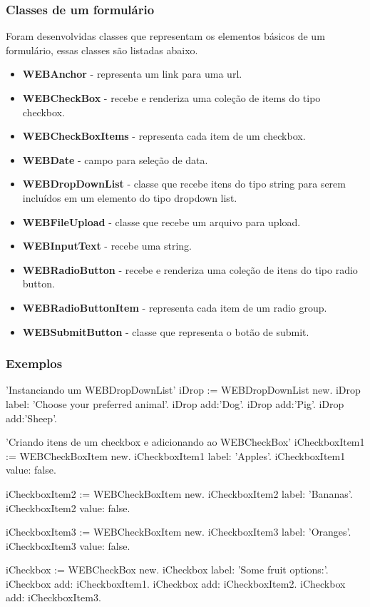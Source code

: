 \subsubsection{Classes de um formulário}

Foram desenvolvidas classes que representam os elementos básicos de um formulário, essas classes são listadas abaixo.

\begin{itemize}
 \item \textbf{WEBAnchor} - representa um link para uma url.
 \item \textbf{WEBCheckBox} - recebe e renderiza uma coleção de items do tipo checkbox.
 \item \textbf{WEBCheckBoxItems} - representa cada item de um checkbox.
 \item \textbf{WEBDate} - campo para seleção de data.
 \item \textbf{WEBDropDownList} - classe que recebe itens do tipo string para serem incluídos em um elemento do tipo dropdown list.
 \item \textbf{WEBFileUpload} - classe que recebe um arquivo para upload.
 \item \textbf{WEBInputText} - recebe uma string.
 \item \textbf{WEBRadioButton} - recebe e renderiza uma coleção de itens do tipo radio button.
 \item \textbf{WEBRadioButtonItem} - representa cada item de um radio group.
 \item \textbf{WEBSubmitButton} - classe que representa o botão de submit. 
\end{itemize}

 
\subsubsection{Exemplos}

\begin{godCode}
'Instanciando um WEBDropDownList'
iDrop := WEBDropDownList new.
iDrop label: 'Choose your preferred animal'.
iDrop add:'Dog'.
iDrop add:'Pig'.
iDrop add:'Sheep'.

'Criando itens de um checkbox e adicionando ao WEBCheckBox'
iCheckboxItem1 := WEBCheckBoxItem new.
iCheckboxItem1 label: 'Apples'.
iCheckboxItem1 value: false.

iCheckboxItem2 := WEBCheckBoxItem new.
iCheckboxItem2 label: 'Bananas'.
iCheckboxItem2 value: false.

iCheckboxItem3 := WEBCheckBoxItem new.
iCheckboxItem3 label: 'Oranges'.
iCheckboxItem3 value: false.

iCheckbox := WEBCheckBox new.
iCheckbox label: 'Some fruit options:'.
iCheckbox add: iCheckboxItem1.
iCheckbox add: iCheckboxItem2.
iCheckbox add: iCheckboxItem3.
\end{godCode}




